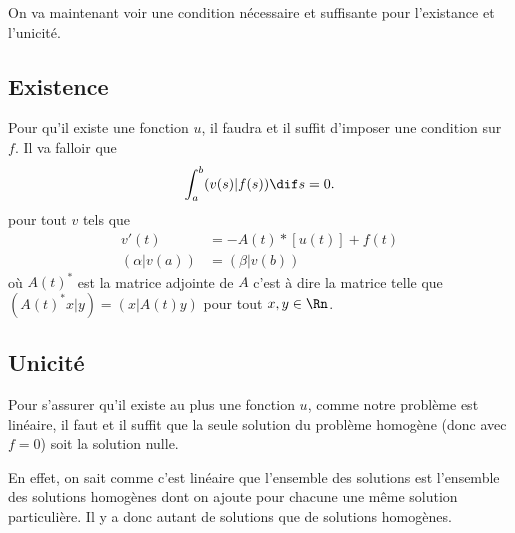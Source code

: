 On va maintenant voir une condition nécessaire et suffisante pour
l'existance et l'unicité.
\subsection{Existence}
Pour qu'il existe une fonction $u$,
il faudra et il suffit d'imposer une condition sur $f$.
Il va falloir que
\[ \int_a^b (v(s)|f(s)) \dif s = 0. \]
pour tout $v$ tels que
\begin{align*}
  v'(t) & = -A(t)*[u(t)] + f(t)\\
  (\alpha|v(a)) & = (\beta|v(b))
\end{align*}
où $A(t)^*$ est la  matrice adjointe de $A$ c'est à dire la matrice telle
que $(A(t)^*x|y) = (x|A(t)y)$ pour tout $x,y \in \Rn$.

\subsection{Unicité}
Pour s'assurer qu'il existe au plus une fonction $u$,
comme notre problème est linéaire,
il faut et il suffit que la seule solution
du problème homogène (donc avec $f = 0$)
soit la solution nulle.

En effet,
on sait comme c'est linéaire que l'ensemble des solutions
est l'ensemble des solutions homogènes dont on ajoute
pour chacune une même solution particulière.
Il y a donc autant de solutions que de solutions homogènes.


